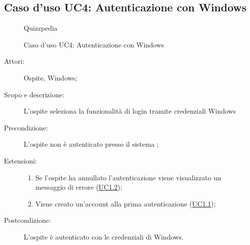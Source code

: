 \subsection{Caso d'uso UC4: Autenticazione con Windows}
        \begin{figure}[H]
            \centering
            \begin{resizedtikzpicture}{\textwidth}
		\begin{umlsystem}[x=0, fill=lightgray!20]{Quizzpedia}
		\end{umlsystem}
            \end{resizedtikzpicture}
            \caption{Caso d'uso UC4: Autenticazione con Windows}
            \label{fig:UC4} 
        \end{figure}
    \begin{description}
\item[Attori:] Ospite, Windows;
\item[Scopo e descrizione:] L'ospite seleziona la funzionalità di login tramite credenziali Windows
      \item[Precondizione:] L'ospite non è autenticato presso il sistema
;
    \item[Estensioni:]
      \begin{enumerate}
          \item Se l'ospite ha annullato l'autenticazione viene visualizzato un messaggio di errore (\hyperlink{UC1.2}{UC1.2});
          \item Viene creato un'account alla prima autenticazione	 (\hyperlink{UC1.1}{UC1.1});

      \end{enumerate}
    \item[Postcondizione:] L'ospite è autenticato con le credenziali di Windows.
  \end{description}
\hypertarget{UC5}{}

